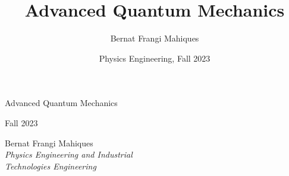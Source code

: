 \documentclass[a4paper,11pt,final]{article}
\title{Advanced Quantum Mechanics}
\date{Physics Engineering, Fall 2023}
\author{Bernat Frangi Mahiques}
\begin{document}
\begin{titlepage}
    \centering\Large\null\vfill

    {\Huge Advanced Quantum Mechanics}\\ 
    \vspace{1em}

    Fall 2023\\
    \vskip10cm

    Bernat Frangi Mahiques\\

    \emph{Physics Engineering and Industrial\\Technologies Engineering}\\
\end{titlepage}

\newpage
\pagestyle{plain}    
\tableofcontents
\newpage


\end{document}
